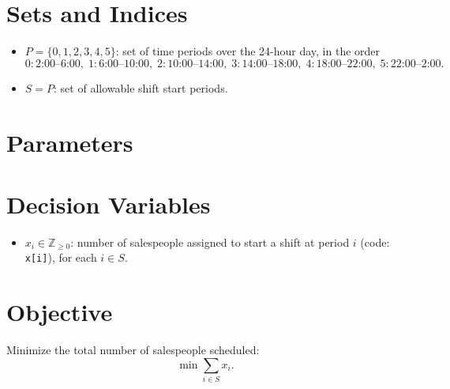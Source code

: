 \section*{Sets and Indices}

\begin{itemize}
    \item $P = \{0,1,2,3,4,5\}$: set of time periods over the 24-hour day, in the order
    \[
    0:\text{2:00--6:00},\;
    1:\text{6:00--10:00},\;
    2:\text{10:00--14:00},\;
    3:\text{14:00--18:00},\;
    4:\text{18:00--22:00},\;
    5:\text{22:00--2:00}.
    \]
    \item $S = P$: set of allowable shift start periods.
\end{itemize}

\section*{Parameters}


\section*{Decision Variables}

\begin{itemize}
    \item $x_i \in {}_{}$: number of salespeople assigned to start a shift at period $i$ (code: \texttt{x[i]}), for each $i \in S$.
\end{itemize}

\section*{Objective}

Minimize the total number of salespeople scheduled:
\[
\min \sum_{i \in S} x_i.
\]


